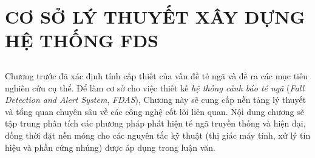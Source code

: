 \chapter{CƠ SỞ LÝ THUYẾT XÂY DỰNG HỆ THỐNG FDS} 
\label{chap:theoretical_basis}

\section*{} %

Chương trước đã xác định tính cấp thiết của vấn đề té ngã và đề ra các mục tiêu nghiên cứu cụ thể.  
Để làm cơ sở cho việc thiết kế \emph{hệ thống cảnh báo té ngã} (\emph{Fall Detection and Alert System}, \emph{FDAS}), Chương này sẽ cung cấp nền tảng lý thuyết và tổng quan chuyên sâu về các công nghệ cốt lõi liên quan.  
Nội dung chương sẽ tập trung phân tích các phương pháp phát hiện té ngã truyền thống và hiện đại, đồng thời đặt nền móng cho các nguyên tắc kỹ thuật (thị giác máy tính, xử lý tín hiệu và phần cứng nhúng) được áp dụng trong luận văn.






